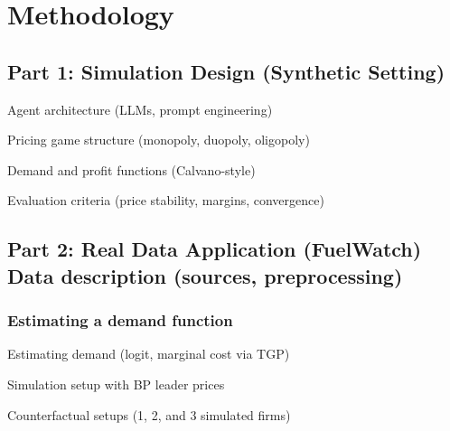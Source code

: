 \section{Methodology}

\subsection{Part 1: Simulation Design (Synthetic Setting)}

Agent architecture (LLMs, prompt engineering)

Pricing game structure (monopoly, duopoly, oligopoly)

Demand and profit functions (Calvano-style)

Evaluation criteria (price stability, margins, convergence)

\subsection{Part 2: Real Data Application (FuelWatch)
Data description (sources, preprocessing)}

\subsubsection{Estimating a demand function}

Estimating demand (logit, marginal cost via TGP)

Simulation setup with BP leader prices

Counterfactual setups (1, 2, and 3 simulated firms)